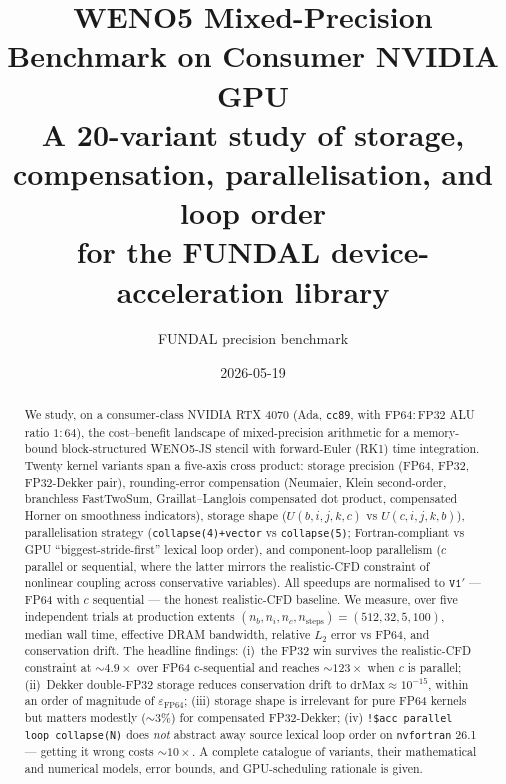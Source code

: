 \documentclass[11pt,a4paper]{article}
\title{
    \vspace{-1.5cm}
    \Large WENO5 Mixed-Precision Benchmark on Consumer NVIDIA GPU\\[0.3em]
    \large A 20-variant study of storage, compensation, parallelisation, and loop order\\[0.2em]
    \normalsize for the FUNDAL device-acceleration library
}
\author{FUNDAL precision benchmark}
\date{2026-05-19}
\begin{document}
\maketitle
\vspace{-0.8em}

\begin{abstract}
\noindent We study, on a consumer-class NVIDIA RTX 4070 (Ada, \texttt{cc89}, with
\(\mathrm{FP64{:}FP32}\) ALU ratio \(1{:}64\)), the cost--benefit
landscape of mixed-precision arithmetic for a memory-bound
block-structured WENO5-JS stencil with forward-Euler (RK1) time
integration. Twenty kernel variants span a five-axis cross product:
storage precision (FP64, FP32, FP32-Dekker pair), rounding-error
compensation (Neumaier, Klein second-order, branchless FastTwoSum,
Graillat--Langlois compensated dot product, compensated Horner on
smoothness indicators), storage shape (\(U(b,i,j,k,c)\) vs
\(U(c,i,j,k,b)\)), parallelisation strategy
(\texttt{collapse(4)+vector} vs \texttt{collapse(5)}; Fortran-compliant
vs GPU ``biggest-stride-first'' lexical loop order), and
component-loop parallelism (\(c\) parallel or sequential, where the
latter mirrors the realistic-CFD constraint of nonlinear coupling
across conservative variables). All speedups are normalised to
\(\mathtt{V1'}\) --- FP64 with \(c\) sequential --- the honest
realistic-CFD baseline. We measure, over five independent trials at
production extents \((n_b, n_i, n_c, n_{\mathrm{steps}}) = (512, 32,
5, 100)\), median wall time, effective DRAM bandwidth, relative
\(L_2\) error vs FP64, and conservation drift. The headline
findings: (i)~the FP32 win survives the realistic-CFD constraint at
\(\sim 4.9\times\) over FP64 c-sequential and reaches \(\sim
123\times\) when \(c\) is parallel; (ii)~Dekker double-FP32 storage
reduces conservation drift to \(\mathrm{drMax} \approx 10^{-15}\),
within an order of magnitude of \(\varepsilon_{\mathrm{FP64}}\); (iii)
storage shape is irrelevant for pure FP64 kernels but matters
modestly (\(\sim 3\%\)) for compensated FP32-Dekker; (iv)
\texttt{!\$acc parallel loop collapse(N)} does \emph{not} abstract
away source lexical loop order on \texttt{nvfortran} 26.1 --- getting
it wrong costs \(\sim 10\times\). A complete catalogue of variants,
their mathematical and numerical models, error bounds, and
GPU-scheduling rationale is given.
\end{abstract}

\end{document}
